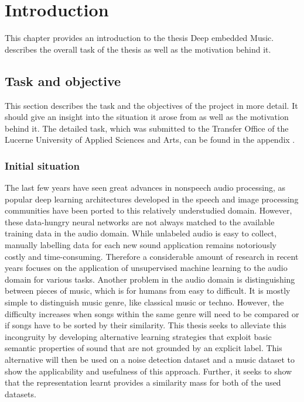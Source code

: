 \chapter{Introduction}
\label{ch:Introduction}
This chapter provides an introduction to the thesis \flqq Deep embedded Music\frqq.  describes the overall task of the thesis as well as the motivation behind it.

\section{Task and objective}
\label{sec:Task-Objective}
This section describes the task and the objectives of the project in more detail. It should give an insight into the situation it arose from as well as the motivation behind it. The detailed task, which was submitted to the Transfer Office of the Lucerne University of Applied Sciences and Arts, can be found in the appendix .

\subsection{Initial situation}
\label{sub:Initial-Stituation}
The last few years have seen great advances in nonspeech audio processing, as popular deep learning architectures developed in the speech and image processing communities have been ported to this relatively understudied domain. However, these data-hungry neural networks are not always matched to the available training data in the audio domain. While unlabeled audio is easy to collect, manually labelling data for each new sound application remains notoriously costly and time-consuming. Therefore a considerable amount of research in recent years focuses on the application of unsupervised machine learning to the audio domain for various tasks.
\newline
\newline
Another problem in the audio domain is distinguishing between pieces of music, which is for humans from easy to difficult. It is mostly simple to distinguish music genre, like classical music or techno. However, the difficulty increases when songs within the same genre will need to be compared or if songs have to be sorted by their similarity.
\newline
\newline
This thesis seeks to alleviate this incongruity by developing alternative learning strategies that exploit basic semantic properties of sound that are not grounded by an explicit label. This alternative will then be used on a noise detection dataset and a music dataset to show the applicability and usefulness of this approach. Further, it seeks to show that the representation learnt provides a similarity mass for both of the used datasets.

